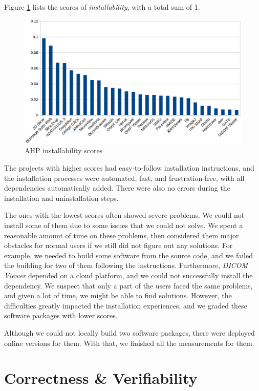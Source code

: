 Figure \ref{fg_installability_scores} lists the scores of \textit{installability}, with a total sum of 1.

\begin{figure}[H]
\includegraphics[scale=0.38]{figures/installability_scores.png}
\caption{AHP installability scores}
\label{fg_installability_scores}
\end{figure}

The projects with higher scores had easy-to-follow installation instructions, and the installation processes were automated, fast, and frustration-free, with all dependencies automatically added. There were also no errors during the installation and uninstallation steps.

The ones with the lowest scores often showed severe problems. We could not install some of them due to some issues that we could not solve. We spent a reasonable amount of time on these problems, then considered them major obstacles for normal users if we still did not figure out any solutions. For example, we needed to build some software from the source code, and we failed the building for two of them following the instructions. Furthermore, \textit{DICOM Viewer} depended on a cloud platform, and we could not successfully install the dependency. We suspect that only a part of the users faced the same problems, and given a lot of time, we might be able to find solutions. However, the difficulties greatly impacted the installation experiences, and we graded these software packages with lower scores.

Although we could not locally build two software packages, there were deployed online versions for them. With that, we finished all the measurements for them.

\section{Correctness \& Verifiability}

